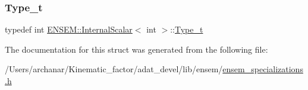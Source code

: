 \subsubsection{\texorpdfstring{Type\_t}{Type\_t}\hspace{0.1cm}{\footnotesize\ttfamily [2/2]}}
{\footnotesize\ttfamily typedef int \mbox{\hyperlink{structENSEM_1_1InternalScalar}{E\+N\+S\+E\+M\+::\+Internal\+Scalar}}$<$ int $>$\+::\mbox{\hyperlink{structENSEM_1_1InternalScalar_3_01int_01_4_a5814154ceb365d4ebbd319bcace78528}{Type\+\_\+t}}}



The documentation for this struct was generated from the following file\+:\begin{DoxyCompactItemize}
\item 
/\+Users/archanar/\+Kinematic\+\_\+factor/adat\+\_\+devel/lib/ensem/\mbox{\hyperlink{lib_2ensem_2ensem__specializations_8h}{ensem\+\_\+specializations.\+h}}\end{DoxyCompactItemize}
